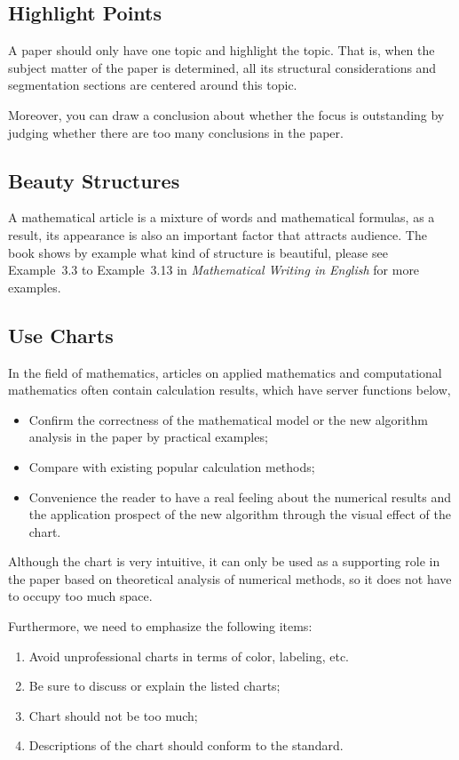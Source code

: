 \subsection{Highlight Points}
A paper should only have one topic and highlight the topic. That is, when the subject matter of the paper is determined, all its structural considerations and segmentation sections are centered around this topic.

Moreover, you can draw a conclusion about whether the focus is outstanding by judging whether there are too many conclusions in the paper.


\subsection{Beauty Structures}
A mathematical article is a mixture of words and mathematical formulas, as a result, its appearance is also an important factor that attracts audience. The book shows by example what kind of structure is beautiful, please see Example~3.3 to Example~3.13 in \emph{Mathematical Writing in English}\cite{2013数学之英文写作} for more examples.


\subsection{Use Charts}
In the field of mathematics, articles on applied mathematics and computational mathematics often contain calculation results, which have server functions below,
\begin{itemize}
	\item Confirm the correctness of the mathematical model or the new algorithm analysis in the paper by practical examples;
	\item Compare with existing popular calculation methods;
	\item Convenience the reader to have a real feeling about the numerical results and the application prospect of the new algorithm through the visual effect of the chart.
\end{itemize}

Although the chart is very intuitive, it can only be used as a supporting role in the paper based on theoretical analysis of numerical methods, so it does not have to occupy too much space.

Furthermore, we need to emphasize the following items:
\begin{enumerate}[label={\Alph*)}]
	\item Avoid unprofessional charts in terms of color, labeling, etc.
	\item Be sure to discuss or explain the listed charts;
	\item Chart should not be too much;
	\item Descriptions of the chart should conform to the standard.
\end{enumerate}


